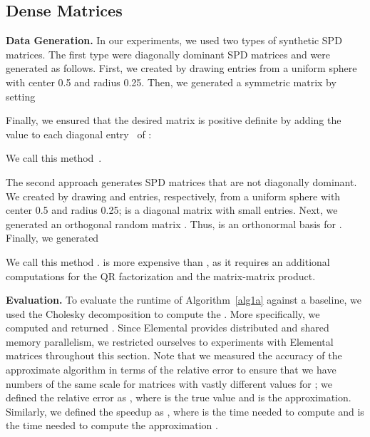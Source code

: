 \subsection{Dense Matrices}
\label{subsec:dense_matrices}
\vspace{0.01in}\noindent \textbf{Data Generation.}
In our experiments, we used two types of synthetic SPD matrices. The first
type were diagonally dominant SPD matrices and were generated as follows.
First, we created  by drawing  entries from a
uniform sphere with center 0.5 and radius 0.25.
Then, we generated a symmetric matrix  by setting

Finally, we ensured that the desired matrix  is positive definite by adding the value  to
each diagonal entry~\cite{curran2009variation} of :

We call this method~.

The second approach generates SPD matrices that are not diagonally dominant.
We created  by drawing  and 
entries, respectively, from a uniform sphere with center 0.5 and radius 0.25;
 is a diagonal matrix with small entries.
Next, we generated an orthogonal random matrix . Thus,
 is an orthonormal basis for .
Finally, we generated

We call this method .
 is more expensive than , as it requires
an additional  computations for the QR factorization and the
matrix-matrix product.

\vspace{0.02in}\noindent \textbf{Evaluation.}
To evaluate the runtime of Algorithm~\ref{alg1a} against a baseline, we used the Cholesky decomposition
to compute the . More specifically, we computed  and
returned .
Since Elemental provides distributed and shared memory parallelism, we restricted
ourselves to experiments with Elemental matrices throughout this section.
Note that we measured the accuracy of the approximate algorithm in terms of the
relative error to ensure that we have numbers of the same scale for matrices
with vastly different values for ;
we defined the relative error  as , where  is the true value and
 is the approximation.
Similarly, we defined the speedup  as ,
where  is the time needed to compute  and  is the time needed to
compute the approximation .

